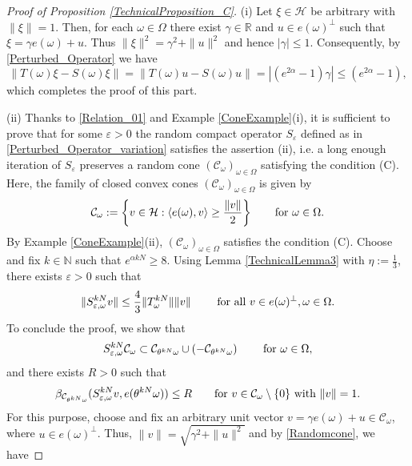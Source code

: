 \documentclass[pdflatex,sn-mathphys-num]{sn-jnl}%
\theoremstyle{thmstyleone}%
\theoremstyle{thmstyletwo}%
\theoremstyle{thmstylethree}%
\newcommand{\N}{\mathbb{N}}
\newcommand{\R}{\mathbb{R}}
\newcommand{\cH}{\mathcal{H}}
\newcommand{\cC}{\mathcal{C}}
\newcommand{\eps}{\varepsilon}
\numberwithin{equation}{section}
\begin{document}
\begin{proof}[Proof of Proposition \ref{TechnicalProposition_C}]
(i) Let $\xi\in \cH$ be arbitrary with $\|\xi\|=1$. Then, for each $\omega\in\Omega$ there exist $\gamma\in\R$ and $u\in e(\omega)^{\perp}$ such that $\xi=\gamma e(\omega)+u$. Thus $\|\xi\|^2=\gamma^2+\|u\|^2$ and hence $|\gamma|\leq 1$. Consequently, by \eqref{Perturbed_Operator} we have 
\[
\|T(\omega) \xi-S(\omega)\xi\|=\|T(\omega) u-S(\omega)u\|=|(e^{2\alpha}-1)\gamma|\leq (e^{2\alpha}-1),
\]
which completes the proof of this part.

(ii) Thanks to \eqref{Relation_01} and Example \ref{ConeExample}(i), it is sufficient to prove that for some $\eps>0$ the random compact operator $S_{\eps}$ defined as in \eqref{Perturbed_Operator_variation} satisfies the assertion (ii), i.e. a long enough iteration of  $S_{\eps}$ preserves a random cone $(\cC_{\omega})_{\omega\in\Omega}$ satisfying the condition (C). Here, the family of closed convex cones $(\cC_{\omega})_{\omega\in\Omega}$ is given by 
\begin{equation}\label{Randomcone}
\cC_{\omega}:=\left\{v\in \cH:\langle e(\omega),v\rangle \geq\frac{\|v\|}{2}\right\}\qquad \hbox{for } \omega\in\Omega.
\end{equation}
By Example \ref{ConeExample}(ii),  $(\cC_{\omega})_{\omega\in\Omega}$ satisfies the condition (C). Choose and fix  $k\in\N$ such that $ e^{\alpha k N}\geq 8$. Using  Lemma \ref{TechnicalLemma3} with  $\eta:=\frac{1}{3}$, there exists $\eps>0$ such that  
\begin{equation}\label{Twoconstants}
\|S_{\eps,\omega}^{kN} v\|\leq \frac{4}{3}\|T_{\omega}^{kN}\|\| v\|\qquad \hbox{ for all } v\in e(\omega)^{\perp}, \omega\in \Omega.
\end{equation}
To conclude the proof, we show that 
\begin{equation}\label{InvarianceCone}
S_{\eps,\omega}^{kN} \cC_{\omega}
\subset \mathcal C_{\theta^{kN} \omega}\cup (-\mathcal C_{\theta^{kN}\omega})\qquad\hbox{ for } \omega\in\Omega,
\end{equation}
and there exists $R>0$ such that 
\begin{equation}\label{Step3_Eq1}
\beta_{\cC_{\theta^{kN}\omega}}(S_{\eps,\omega}^{kN} v,e(\theta^{kN}\omega))\leq R\qquad\hbox{for } v\in \cC_{\omega}\setminus\{0\} \hbox{ with } \|v\|=1.    
\end{equation}
For this purpose, choose and fix an arbitrary unit vector $v=\gamma e(\omega)+ u\in \cC_{\omega}$, where $u\in e(\omega)^{\perp}$. Thus, $\|v\|=\sqrt{\gamma^2+\|u\|^2}$ and by \eqref{Randomcone}, we have 

\end{proof}
\end{document}
